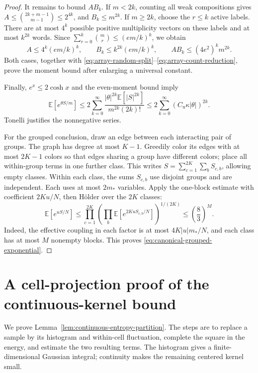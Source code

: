 \documentclass[11pt,reqno]{amsart}
\numberwithin{equation}{section}
\theoremstyle{plain}
\theoremstyle{definition}
\newcommand{\E}{\mathbb E}
\begin{document}
\begin{proof}
It remains to bound $A B_k$.  If $m<2k$, counting all weak compositions gives
$A\le\binom{2k+m-1}{m-1}\le2^{4k}$, and $B_k\le m^{2k}$.
If $m\ge2k$, choose the $r\le k$ active labels.  There are at most $4^k$ possible positive multiplicity vectors on these labels and at most $k^{2k}$ words.  Since
$\sum_{r=0}^k\binom mr\le(em/k)^k$, we obtain
\begin{equation}
 A\le4^k(em/k)^k,\qquad
 B_k\le k^{2k}(em/k)^k,\qquad
 A B_k\le(4e^2)^k m^{2k}.
 \label{eq:array-combinatorial-bound}
\end{equation}
Both cases, together with \eqref{eq:array-random-split}--\eqref{eq:array-count-reduction}, prove the moment bound after enlarging a universal constant.

Finally, $e^x\le2\cosh x$ and the even-moment bound imply
\begin{equation}
 \E[e^{\theta S/m}]
 \le2\sum_{k=0}^\infty
 \frac{|\theta|^{2k}\E[|S|^{2k}]}{m^{2k}(2k)!}
 \le2\sum_{k=0}^\infty(C_{\mathrm u}\kappa|\theta|)^{2k}.
 \label{eq:array-exponential-series}
\end{equation}
Tonelli justifies the nonnegative series.

For the grouped conclusion, draw an edge between each interacting pair of groups.  The graph has degree at most $K-1$.  Greedily color its edges with at most $2K-1$ colors so that edges sharing a group have different colors; place all within-group terms in one further class.  This writes $S=\sum_{c=1}^{2K}\sum_b S_{c,b}$, allowing empty classes.  Within each class, the sums $S_{c,b}$ use disjoint groups and are independent.  Each uses at most $2m_*$ variables.  Apply the one-block estimate with coefficient $2Ku/N$, then H\"older over the $2K$ classes:
\begin{equation}
 \E[e^{uS/N}]
 \le\prod_{c=1}^{2K}
      \left(\prod_b\E[e^{2KuS_{c,b}/N}]\right)^{1/(2K)}
 \le\left(\frac83\right)^M.
 \label{eq:array-grouped-holder}
\end{equation}
Indeed, the effective coupling in each factor is at most $4K|u|m_*/N$, and each class has at most $M$ nonempty blocks.  This proves \eqref{eq:canonical-grouped-exponential}.
\end{proof}

\appendix
\section{A cell-projection proof of the continuous-kernel bound}
\label{app:continuous-proof}
We prove Lemma~\ref{lem:continuous-entropy-partition}.  The steps are to replace a sample by its histogram and within-cell fluctuation, complete the square in the energy, and estimate the two resulting terms.  The histogram gives a finite-dimensional Gaussian integral; continuity makes the remaining centered kernel small.
\end{document}
